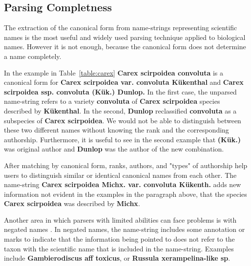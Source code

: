 \documentclass{bmcart}
\begin{document}
\subsection*{Parsing Completness}

The extraction of the canonical form from name-strings representing scientific
names is the most useful and widely used parsing technique applied to biological names. However it
is not enough, because the canonical form does not determine a name completely.

In the example in Table~\ref{table:carex} \textbf{Carex scirpoidea convoluta}
is a canonical form for \textbf{Carex scirpoidea var. convoluta Kükenthal} and
\textbf{Carex scirpoidea ssp. convoluta (Kük.) Dunlop.} In the first case, the
unparsed name-string refers to a variety \textbf{convoluta} of \textbf{Carex
scirpoidea} species described by \textbf{Kükenthal}. In the second,
\textbf{Dunlop} reclassified \textbf{convoluta} as a subspecies of \textbf{Carex
scirpoidea}. We would not be able to distinguish between these two different
names without knowing the rank and the corresponding authorship.
Furthermore, it is useful to see in the second example that \textbf{(Kük.)}
was original author and \textbf{Dunlop} was the author of the new combination.

After matching by canonical form, ranks, authors, and "types" of
authorship help users to distinguish similar or identical canonical names from
each other. The name-string \textbf{Carex scirpoidea Michx. var. convoluta
Kükenth.} adds new information not evident in the examples in the paragraph above, that the species \textbf{Carex scirpoidea} was
described by \textbf{Michx}.

Another area in which parsers with limited abilities can face  problems is
with negated names \cite{Patterson:inpress-a}. In negated names, the name-string
 includes some annotation or marks to indicate that the information being pointed to does
not refer to the taxon with the scientific name that is included in the
name-string. Examples include \textbf{Gambierodiscus aff toxicus}, or
\textbf{Russula xerampelina-like sp}.
\end{document}
